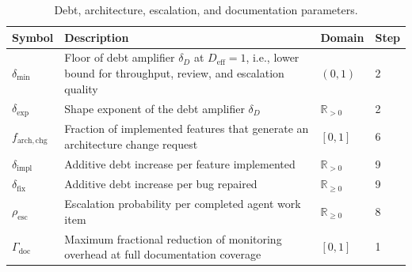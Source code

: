 \documentclass[smallextended]{svjour3}       %
\begin{document}
\begin{table}[t]
\caption{Debt, architecture, escalation, and documentation parameters.}
\label{tab:params:debt}
\footnotesize
\begin{tabularx}{\linewidth}{p{1.8cm}Xp{1.5cm}p{1.4cm}}
\toprule
Symbol & Description & Domain & Step \\
\midrule
$\delta_\mathrm{min}$           & Floor of debt amplifier $\delta_D$ at $D_\mathrm{eff}=1$, i.e., lower bound for throughput, review, and escalation quality & $(0,1)$ & 2 \\[2pt]
$\delta_\mathrm{exp}$           & Shape exponent of the debt amplifier $\delta_D$                          & $\mathbb{R}_{>0}$     & 2 \\[2pt]
$f_\mathrm{arch,chg}$  & Fraction of implemented features that generate an architecture change request & $[0,1]$            & 6 \\[2pt]
$\delta_\mathrm{impl}$          & Additive debt increase per feature implemented        & $\mathbb{R}_{>0}$     & 9 \\[2pt]
$\delta_\mathrm{fix}$           & Additive debt increase per bug repaired               & $\mathbb{R}_{\geq 0}$ & 9 \\[2pt]
$\rho_\mathrm{esc}$             & Escalation probability per completed agent work item                                     & $\mathbb{R}_{\geq 0}$ & 8 \\[2pt]
$\Gamma_\mathrm{doc}$           & Maximum fractional reduction of monitoring overhead at full documentation coverage & $[0,1]$ & 1 \\
\bottomrule
\end{tabularx}
\end{table}
\end{document}
